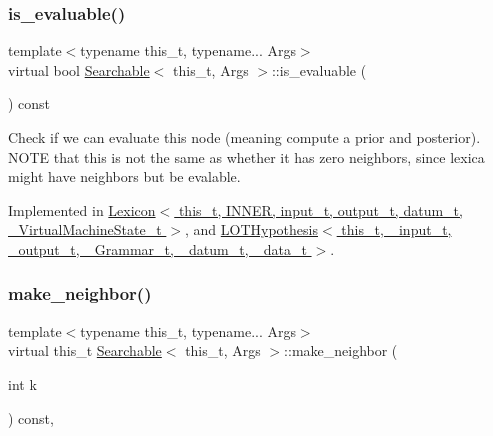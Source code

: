 \subsubsection{\texorpdfstring{is\+\_\+evaluable()}{is\_evaluable()}}
{\footnotesize\ttfamily template$<$typename this\+\_\+t, typename... Args$>$ \\
virtual bool \hyperlink{class_searchable}{Searchable}$<$ this\+\_\+t, Args $>$\+::is\+\_\+evaluable (\begin{DoxyParamCaption}{ }\end{DoxyParamCaption}) const\hspace{0.3cm}{\ttfamily [pure virtual]}}



Check if we can evaluate this node (meaning compute a prior and posterior). N\+O\+TE that this is not the same as whether it has zero neighbors, since lexica might have neighbors but be evalable. 



Implemented in \hyperlink{class_lexicon_a7742f252ea9909f12071b5af500310cf}{Lexicon$<$ this\+\_\+t, I\+N\+N\+E\+R, input\+\_\+t, output\+\_\+t, datum\+\_\+t, \+\_\+\+Virtual\+Machine\+State\+\_\+t $>$}, and \hyperlink{class_l_o_t_hypothesis_ac5d6d329147999aee0e37b51c6529385}{L\+O\+T\+Hypothesis$<$ this\+\_\+t, \+\_\+input\+\_\+t, \+\_\+output\+\_\+t, \+\_\+\+Grammar\+\_\+t, \+\_\+datum\+\_\+t, \+\_\+data\+\_\+t $>$}.

\mbox{\label{class_searchable_ac7d4105db85a6601dcb406074bdb3f8f}} 
\subsubsection{\texorpdfstring{make\+\_\+neighbor()}{make\_neighbor()}}
{\footnotesize\ttfamily template$<$typename this\+\_\+t, typename... Args$>$ \\
virtual this\+\_\+t \hyperlink{class_searchable}{Searchable}$<$ this\+\_\+t, Args $>$\+::make\+\_\+neighbor (\begin{DoxyParamCaption}\item[{int}]{k }\end{DoxyParamCaption}) const\hspace{0.3cm}{\ttfamily [inline]}, {\ttfamily [virtual]}}



